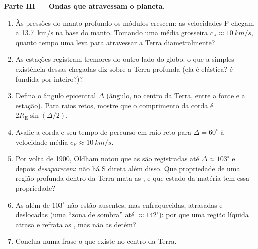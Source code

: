\begin{problem}
\medskip\noindent\textbf{Parte III --- Ondas que atravessam o planeta.}
\begin{enumerate}[resume]
  \item Às pressões do manto profundo os módulos crescem: as
        velocidades P chegam a \qty{13.7}{km/s} na base do manto.
        Tomando uma média grosseira $c_{\text{P}} \approx \qty{10}{km/s}$,
        quanto tempo uma  leva para atravessar a Terra
        diametralmente?
  \item As estações registram tremores do outro lado do globo: o que a
        simples existência dessas chegadas diz sobre a Terra profunda
        (ela é elástica? é fundida por inteiro?)?
  \item Defina o ângulo epicentral $\Delta$ (ângulo, no centro da
        Terra, entre a fonte e a estação). Para raios retos, mostre
        que o comprimento da corda é $2R_{\text{E}}\sin(\Delta/2)$.
  \item Avalie a corda e seu tempo de percurso em raio reto para
        $\Delta = 60^\circ$ à velocidade média $c_{\text{P}} \approx
        \qty{10}{km/s}$.
  \item Por volta de 1900, Oldham notou que as  são registradas
        até $\Delta \approx 103^\circ$ e depois \emph{desaparecem}:
        não há S direta além disso. Que propriedade de uma região
        profunda dentro da Terra mata as , e que estado da
        matéria tem essa propriedade?
  \item As  além de $103^\circ$ não estão ausentes, mas
        enfraquecidas, atrasadas e deslocadas (uma ``zona de sombra''
        até $\approx 142^\circ$): por que uma região líquida atrasa e
        refrata as , mas não as detém?
  \item Conclua numa frase o que existe no centro da Terra.
\end{enumerate}


\end{problem}

